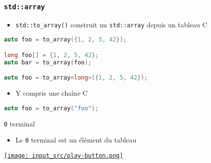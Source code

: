 \documentclass[C++.tex]{subfiles}
\begin{document}
\begin{frame}[fragile]
	\frametitle{\lstinline|std::array|}
	\begin{itemize}
		\item \lstinline|std::to_array()| construit un \lstinline|std::array| depuis un tableau C
	\end{itemize}

	\begin{lstlisting}[language=C++]
auto foo = to_array({1, 2, 5, 42});

long foo[] = {1, 2, 5, 42};
auto bar = to_array(foo);

auto foo = to_array<long>({1, 2, 5, 42});\end{lstlisting}

	\begin{itemize}
		\item Y compris une chaîne C
	\end{itemize}

	\begin{lstlisting}[language=C++]
auto foo = to_array("foo");\end{lstlisting}

	\begin{alertblock}{\lstinline|0| terminal}
		\begin{itemize}
			\item Le \lstinline|0| terminal est un élément du tableau
		\end{itemize}
	\end{alertblock}

	\hfill
	\href{https://godbolt.org/#z:OYLghAFBqd5QCxAYwPYBMCmBRdBLAF1QCcAaPECAMzwBtMA7AQwFtMQByARg9KtQYEAysib0QXACx8BBAKoBnTAAUAHpwAMvAFYTStJg1DIApACYAQuYukl9ZATwDKjdAGFUtAK4sGe1wAyeAyYAHI%2BAEaYxCAAzADspAAOqAqETgwe3r56KWmOAkEh4SxRMQm2mPYFDEIETMQEWT5%2BXJXVGXUNBEVhkdFxiQr1jc05bcPdvSVlgwCUtqhexMjsHOaxwcjeWADUJrFuDcRMAJ4H2CYaAIIbWzuY%2B4dOw8SYrBdXtzfBBLssTGCEDmXxM8SsN12%2B3BXyhUKYXiIu34qCeABFdsN0CAQEQAPrHM4QcxmFEkkGxCHXOGYgjYlBLP4HNzM5GoVAAOjSAC9MMCnizDvszGYTABWNwMEkHKk0/jECBoBjDXYIpHIXYgNmoEGQuFg2U02n0tCIgWsjXM1kk4Wiymw/XxNEOqFYnGmpmHa0i8WS6X2vVg503B0Gl2qxGolHo404/GE07E8FtXZmUi7MXpyRpjMADiDFMNrrp7sZ5qFKK5eF5/KtQulEqlPoD1Lh8sVAhVatRGq1KN1rahYb1NLdDLNdbcu0tXvrIttMvDQfDY495anDb9zcNy5DgZhI92tAEwG14qsYoxByvyfTOczu2z6disXTXFFTsXh%2B7uwiDRjY7xsQJyJv2X6DrG46eoKU5/sQVY1nM64Lo2/pFmyCpKl2kbTpqv4NAONLDhBxYmmWk64RRNpoUun6Hqu5GzhuPqoduoZ0bcHEcAstCcGKvB%2BBwWikKgnAspY1iYksKyPBsPCkAQmjcQsADWIBiho%2BicJIAlKSJnC8AoICaYpQncaQcCwEgmCqJgyCRmQFAQA0wAKMohhVEICCoAA7oJ8loCwSR0EwNTuSEtBeb5gnCYFwX0DEwBcO%2BpBxXQ0QAPKIlFfl6TZdnXMQrkGaQ%2BXIHU%2BCCbw/CCCIYjsFIMiCIoKjqGZpC6G0BhGCg1jWPoeAREZsDMGwIAROywykAAbgM3DxPxcwLKgSQ1EZHAALRYtepgSZYZjCQo0mrHoWLBOFnnebl3C8AQbxrPJPknEkSk8XxuntaJHDYLZ9lEMQuyqLmABsG3A5IuzAMgGrJRyZi7BA4lWJY6a4IQJDCrEXBzLdr0LAg7xYDEwKkGpGlaRwOmkDFvBfYZxkKXjFNmB9wl04zZlLTN0RpM4khAA%3D%3D}{\texttt{[image: input\_src/play-button.png]}}
\end{frame}
\end{document}
